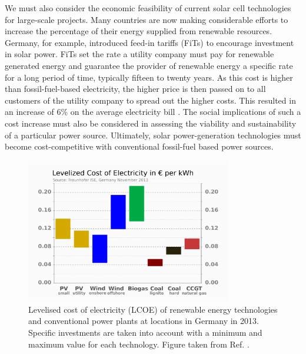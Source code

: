 \documentclass[11pt, twoside]{report}
\begin{document}
We must also consider the economic feasibility of current solar cell technologies for large-scale projects.
Many countries are now making considerable efforts to increase the percentage of their energy supplied from renewable resources. Germany, for example, introduced feed-in tariffs (FiTs) to encourage investment in solar power.
FiTs set the rate a utility company must pay for renewable generated energy and guarantee the provider of renewable energy a specific rate for a long period of time, typically fifteen to twenty years. As this cost is higher than fossil-fuel-based electricity, the higher price is then passed on to all customers of the utility company to spread out the higher costs. This resulted in an increase of 6\% on the average electricity bill \cite{Germany_Oregon}. The social implications of such a cost increase must also be considered in assessing the viability and sustainability of a particular power source.
Ultimately, solar power-generation technologies must become cost-competitive with conventional fossil-fuel based power sources.

\begin{figure}[h!]
  \centering
    \includegraphics[width=0.8\textwidth]{figures/LCOE.png}
    \caption[Levelised cost of electricity (LCOE) of renewable energy technologies and conventional power plants at locations in Germany in 2013.  Specific investments are taken into account with a minimum and maximum value for each technology.]{Levelised cost of electricity (LCOE) of renewable energy technologies and conventional power plants at locations in Germany in 2013.  Specific investments are taken into account with a minimum and maximum value for each technology. Figure taken from Ref. .}
  \label{LCOE}
\end{figure}
\end{document}
